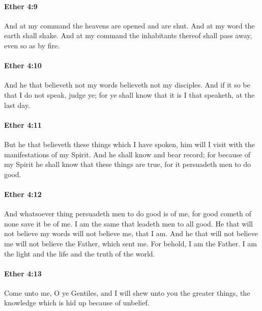 		\paragraph{Ether 4:9} %
			\label{ETHER-4-9}

			And at my command the heavens are opened and are shut.
			And at my word the earth shall shake.
			And at my command the inhabitants thereof shall pass away,
			even so as by fire.

		\paragraph{Ether 4:10} %
			\label{ETHER-4-10}

			And he that believeth not my words believeth not my disciples.
			And if it so be that I do not speak, judge ye;
			for ye shall know that it is I that speaketh,
			at the last day.

		\paragraph{Ether 4:11} %
			\label{ETHER-4-11}

			But he that believeth these things which I have spoken,
			him will I visit with the manifestations of my Spirit.
			And he shall know and bear record;
			for because of my Spirit he shall know that these things are true,
			for it persuadeth men to do good.

		\paragraph{Ether 4:12} %
			\label{ETHER-4-12}

			And whatsoever thing persuadeth men to do good is of me,
			for good cometh of none save it be of me.
			I am the same that leadeth men to all good.
			He that will not believe my words will not believe me, that I am.
			And he that will not believe me will not believe the Father, which sent me.
			For behold, I am the Father.
			I am the light and the life and the truth of the world.

		\paragraph{Ether 4:13} %
			\label{ETHER-4-13}

			Come unto me, O ye Gentiles,
			and I will shew unto you the greater things,
			the knowledge which is hid up because of unbelief.

